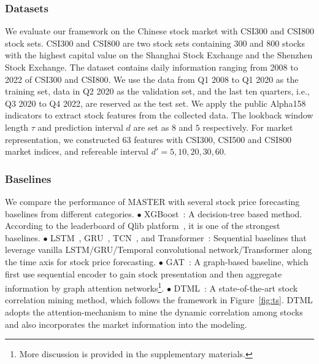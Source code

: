 \subsubsection{Datasets}
We evaluate our framework on the Chinese stock market with CSI300 and CSI800 stock sets. CSI300 and CSI800 are two stock sets containing 300 and 800 stocks with the highest capital value on the Shanghai Stock Exchange and the Shenzhen Stock Exchange. 
The dataset contains daily information ranging from 2008 to 2022 of CSI300 and CSI800. 
We use the data from Q1 2008 to Q1 2020 as the training set, data in Q2 2020 as the validation set, and the last ten quarters, i.e., Q3 2020 to Q4 2022, are reserved as the test set.  We apply the public Alpha158 indicators \cite{yang2020qlib} to extract stock features from the collected data. 
The lookback window length $\tau$ and prediction interval $d$ are set as $8$ and $5$ respectively. 
For market representation, we constructed $63$ features with CSI300, CSI500 and CSI800 market indices, and  refereable interval $d'=5,10,20,30,60$.  

\subsubsection{Baselines}
We compare the performance of MASTER with several stock price forecasting baselines from different categories.
$\bullet$ XGBoost~\cite{chen2016xgboost}: A decision-tree based method. According to the leaderboard of Qlib platform~\cite{yang2020qlib}, it is one of the strongest baselines.
$\bullet$ LSTM~\cite{graves2012long}, GRU~\cite{cho2014learning}, TCN~\cite{bai2018empirical}, and Transformer~\cite{vaswani2017attention}: Sequential baselines that leverage vanilla LSTM/GRU/Temporal convolutional network/Transformer along the time axis for stock price forecasting. 
$\bullet$ GAT~\cite{velivckovic2017graph}: A graph-based baseline, which first use sequential encoder to gain stock presentation and then aggregate information by graph attention networks{\footnote{More discussion is provided in the supplementary materials.}}. 
$\bullet$ DTML~\cite{yoo2021accurate}: A state-of-the-art stock correlation mining method, which follows the framework in Figure~\ref{fig:ts}. DTML adopts the attention-mechanism to mine the dynamic correlation among stocks and also incorporates the market information into the modeling. 

